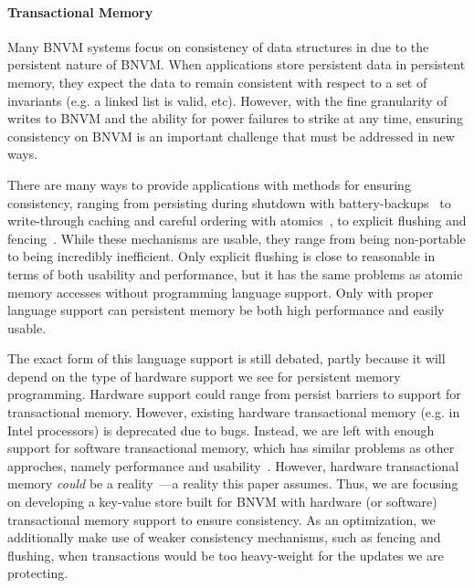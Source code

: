 \paragraph{Transactional Memory}

Many BNVM systems focus on consistency of data structures in due to the
persistent nature of BNVM. When applications store persistent data in
persistent memory, they expect the data to remain consistent with respect to a
set of invariants (e.g. a linked list is valid, etc). However, with the fine
granularity of writes to BNVM and the ability for power failures to strike at
any time, ensuring consistency on BNVM is an important challenge that must be
addressed in new ways.

There are many ways to provide applications with methods for ensuring
consistency, ranging from persisting during shutdown with
battery-backups~\cite{narayanan:asplos12} to write-through caching and careful
ordering with atomics~\cite{bhandari2012implications}, to explicit flushing and
fencing~\cite{condit:sosp09}. While these mechanisms are usable, they range from
being non-portable to being incredibly inefficient. Only explicit flushing is
close to reasonable in terms of both usability and performance, but it has the
same problems as atomic memory accesses without programming language support.
Only with proper language support can persistent memory be both high performance
and easily usable.

The exact form of this language support is still debated, partly because it will
depend on the type of hardware support we see for persistent memory programming.
Hardware support could range from persist barriers to support for transactional
memory. However, existing hardware transactional memory (e.g. in Intel
processors) is deprecated due to bugs. Instead, we are left with enough support
for software transactional memory, which has similar problems as other
approches, namely performance and usability~\cite{stm}. However, hardware
transactional memory \textit{could} be a
reality~\cite{kolli:asplos16,lu:tos16,wang:cal15}---a reality this paper
assumes. Thus, we are focusing on developing a key-value store built for BNVM
with hardware (or software) transactional memory support to ensure consistency.
As an optimization, we additionally make use of weaker consistency mechanisms,
such as fencing and flushing, when transactions would be too heavy-weight for
the updates we are protecting.

